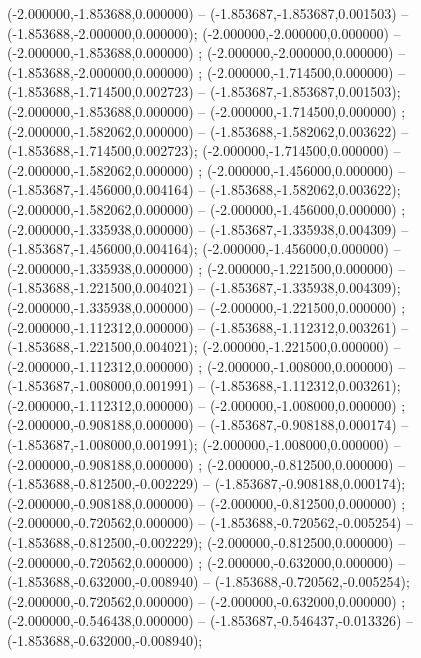  (-2.000000,-1.853688,0.000000) -- (-1.853687,-1.853687,0.001503) -- (-1.853688,-2.000000,0.000000);
 (-2.000000,-2.000000,0.000000) -- (-2.000000,-1.853688,0.000000) ;
 (-2.000000,-2.000000,0.000000) -- (-1.853688,-2.000000,0.000000) ;
 (-2.000000,-1.714500,0.000000) -- (-1.853688,-1.714500,0.002723) -- (-1.853687,-1.853687,0.001503);
 (-2.000000,-1.853688,0.000000) -- (-2.000000,-1.714500,0.000000) ;
 (-2.000000,-1.582062,0.000000) -- (-1.853688,-1.582062,0.003622) -- (-1.853688,-1.714500,0.002723);
 (-2.000000,-1.714500,0.000000) -- (-2.000000,-1.582062,0.000000) ;
 (-2.000000,-1.456000,0.000000) -- (-1.853687,-1.456000,0.004164) -- (-1.853688,-1.582062,0.003622);
 (-2.000000,-1.582062,0.000000) -- (-2.000000,-1.456000,0.000000) ;
 (-2.000000,-1.335938,0.000000) -- (-1.853687,-1.335938,0.004309) -- (-1.853687,-1.456000,0.004164);
 (-2.000000,-1.456000,0.000000) -- (-2.000000,-1.335938,0.000000) ;
 (-2.000000,-1.221500,0.000000) -- (-1.853688,-1.221500,0.004021) -- (-1.853687,-1.335938,0.004309);
 (-2.000000,-1.335938,0.000000) -- (-2.000000,-1.221500,0.000000) ;
 (-2.000000,-1.112312,0.000000) -- (-1.853688,-1.112312,0.003261) -- (-1.853688,-1.221500,0.004021);
 (-2.000000,-1.221500,0.000000) -- (-2.000000,-1.112312,0.000000) ;
 (-2.000000,-1.008000,0.000000) -- (-1.853687,-1.008000,0.001991) -- (-1.853688,-1.112312,0.003261);
 (-2.000000,-1.112312,0.000000) -- (-2.000000,-1.008000,0.000000) ;
 (-2.000000,-0.908188,0.000000) -- (-1.853687,-0.908188,0.000174) -- (-1.853687,-1.008000,0.001991);
 (-2.000000,-1.008000,0.000000) -- (-2.000000,-0.908188,0.000000) ;
 (-2.000000,-0.812500,0.000000) -- (-1.853688,-0.812500,-0.002229) -- (-1.853687,-0.908188,0.000174);
 (-2.000000,-0.908188,0.000000) -- (-2.000000,-0.812500,0.000000) ;
 (-2.000000,-0.720562,0.000000) -- (-1.853688,-0.720562,-0.005254) -- (-1.853688,-0.812500,-0.002229);
 (-2.000000,-0.812500,0.000000) -- (-2.000000,-0.720562,0.000000) ;
 (-2.000000,-0.632000,0.000000) -- (-1.853688,-0.632000,-0.008940) -- (-1.853688,-0.720562,-0.005254);
 (-2.000000,-0.720562,0.000000) -- (-2.000000,-0.632000,0.000000) ;
 (-2.000000,-0.546438,0.000000) -- (-1.853687,-0.546437,-0.013326) -- (-1.853688,-0.632000,-0.008940);
